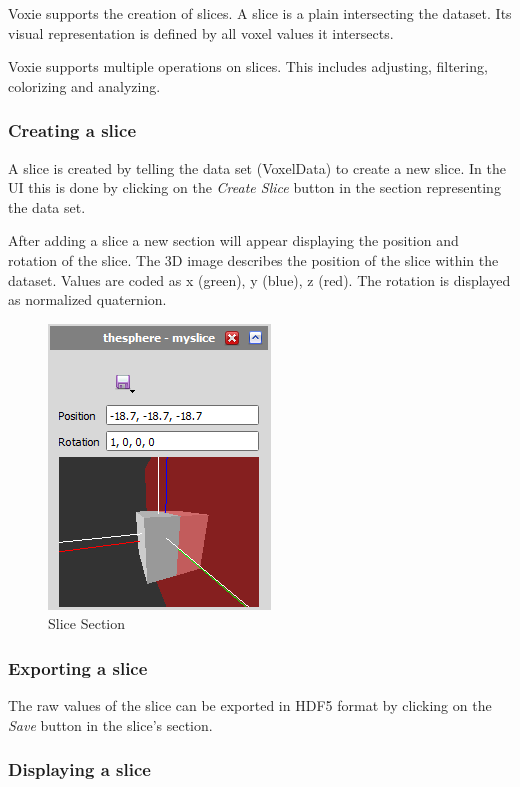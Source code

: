 Voxie supports the creation of slices. A slice is a plain intersecting the dataset. 
Its visual representation is defined by all voxel values it intersects.

Voxie supports multiple operations on slices. This includes adjusting, filtering, colorizing and analyzing.

\subsubsection{Creating a slice}

A slice is created by telling the data set (VoxelData) to create a new slice. In the UI this is done by clicking on the \textit{Create Slice} button in the section representing the data set.

After adding a slice a new section will appear displaying the position and rotation of the slice. The 3D image describes the position of the slice within the dataset. Values are coded as x (green),  y (blue), z (red). The rotation is displayed as normalized quaternion.

\begin{figure}[h]
	\caption{Slice Section}
	\centering
	\includegraphics[scale=1.0]{img/2d/3dslice.png}
\end{figure}

\subsubsection{Exporting a slice}

The raw values of the slice can be exported in HDF5 format by clicking on the \textit{Save} button in the slice's section.

\subsubsection{Displaying a slice}


